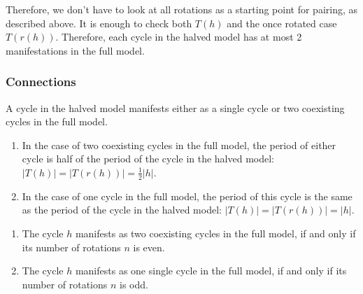 Therefore, we don't have to look at all rotations as a starting point for pairing, as described above.
It is enough to check both $T(h)$ and the once rotated case $T(r(h))$.
Therefore, each cycle in the halved model has at most 2 manifestations in the full model.

\subsubsection{Connections}

\begin{theorem}
	A cycle in the halved model manifests either as a single cycle or two coexisting cycles in the full model.
\end{theorem}

\begin{theorem}
	\begin{enumerate}
		\item In the case of two coexisting cycles in the full model, the period of either cycle is half of the period of the cycle in the halved model: $|T(h)| = |T(r(h))| = \frac{1}{2} |h|$.
		\item In the case of one cycle in the full model, the period of this cycle is the same as the period of the cycle in the halved model: $|T(h)| = |T(r(h))| = |h|$.
	\end{enumerate}
\end{theorem}

\begin{theorem}
	\label{theorem:coex.even.odd}
	\begin{enumerate}
		\item The cycle $h$ manifests as two coexisting cycles in the full model, if and only if its number of rotations $n$ is even.
		\item The cycle $h$ manifests as one single cycle in the full model, if and only if its number of rotations $n$ is odd.
	\end{enumerate}
\end{theorem}

